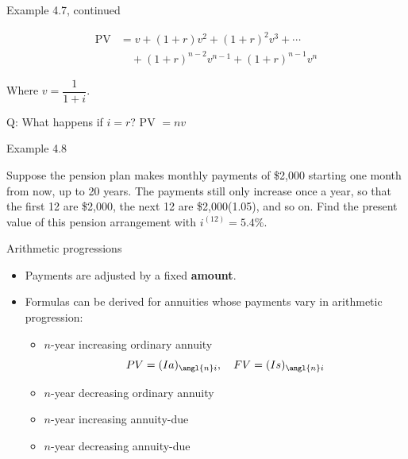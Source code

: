 \documentclass{beamer}
\begin{document}
\begin{frame}{Example 4.7, continued}

\[
\begin{aligned}
\text{PV} &= v + (1+r)v^2 + (1+r)^2 v^3 + \cdots \\
&\quad + (1+r)^{n-2} v^{n-1} + (1+r)^{n-1} v^n
\end{aligned}
\]

\vspace{4em}
Where $v = \dfrac{1}{1+i}$.

\vspace{3em}
Q: What happens if $i = r$? PV $= nv$

\vfill
\end{frame}

\begin{frame}{Example 4.8}

Suppose the pension plan makes monthly payments of \$2,000 starting one month from now, up to 20 years. The payments still only increase once a year, so that the first 12 are \$2,000, the next 12 are \$2,000(1.05), and so on. Find the present value of this pension arrangement with $i^{(12)} = 5.4\%$.

\bigskip
\begin{center}
\end{center}

\vfill
\end{frame}

\begin{frame}{Arithmetic progressions}

\begin{itemize}
\item Payments are adjusted by a fixed \textbf{amount}.
\item Formulas can be derived for annuities whose payments vary in arithmetic progression:
  \begin{itemize}
  \item $n$-year increasing ordinary annuity
  \[
  PV = (Ia)_{\angl{n}i}, \quad FV = (Is)_{\angl{n}i}
  \]
  \item $n$-year decreasing ordinary annuity
  \item $n$-year increasing annuity-due
  \item $n$-year decreasing annuity-due
  \end{itemize}
\end{itemize}

\end{frame}
\end{document}
